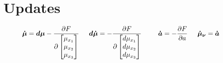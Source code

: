 \documentclass[a4paper]{report}
\begin{document}
\section*{Updates}

\begin{eqnarray}
\boldsymbol{\dot{\mu}} = \boldsymbol{d\mu}- \frac{\partial F}{\partial
  \left[\begin{matrix}
  \mu_{x_1}\\\mu_{x_2}\\\mu_{x_3}\end{matrix}\right]} \hspace{0.2in}&
   \boldsymbol{d\dot{\mu}} = - \frac{\partial F}{\partial
     \left[\begin{matrix}d\mu_{x_1}\\d\mu_{x_2}\\d\mu_{x_3}\end{matrix}\right]} \hspace{0.2in}&
  \boldsymbol{\dot{a}} =- \frac{\partial F}{\partial a}  \hspace{0.2in}
  \boldsymbol{\dot{\mu}_{\nu}} = \boldsymbol{\dot{a}}  \hspace{0.2in}
  \nonumber
\end{eqnarray}
\end{document}
